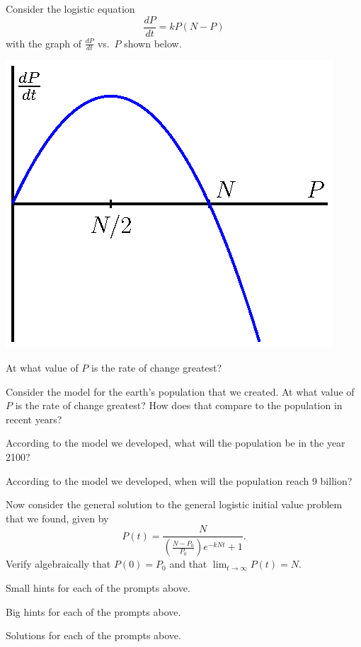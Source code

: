 \begin{activity} \label{A:7.6.2}  
  Consider the logistic equation
  $$
  \frac{dP}{dt} = kP(N-P)
  $$
  with the graph of $\frac{dP}{dt}$ vs.~$P$ shown below.
  \begin{center}
    \includegraphics{figures/7_6_activity_2.eps}
  \end{center}
\ba
\item At what value of $P$ is the rate of change greatest?

\item Consider the model for the earth's population that we created.
  At what value of $P$ is the rate of change greatest?  How does that
  compare to the population in recent years?

\item According to the model we developed, what will the population be
  in the year 2100?

\item According to the model we developed, when will the population
  reach 9 billion?

\item Now consider the general solution to the general logistic initial value problem that
  we found, given by
  $$
  P(t) = \frac{N}{\left(\frac{N-P_0}{P_0}\right)e^{-kNt} + 1}.
  $$
  Verify algebraically that $P(0) = P_0$ and that $\lim_{t\to\infty} P(t) = N$.

\ea
\end{activity}
\begin{smallhint}
\ba
	\item Small hints for each of the prompts above.
\ea
\end{smallhint}
\begin{bighint}
\ba
	\item Big hints for each of the prompts above.
\ea
\end{bighint}
\begin{activitySolution}
\ba
	\item Solutions for each of the prompts above.
\ea
\end{activitySolution}
\aftera